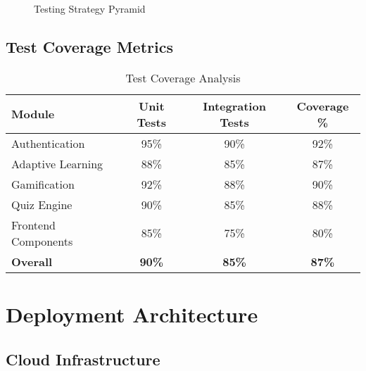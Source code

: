 \documentclass[12pt,a4paper]{article}
\begin{document}
\begin{figure}[H]
\centering
{}
\caption{Testing Strategy Pyramid}
\label{fig:testing-pyramid}
\end{figure}

\subsection{Test Coverage Metrics}

\begin{table}[H]
\centering
\caption{Test Coverage Analysis}
\begin{tabular}{|l|c|c|c|}
\hline
\textbf{Module} & \textbf{Unit Tests} & \textbf{Integration Tests} & \textbf{Coverage \%} \\
\hline
Authentication & 95\% & 90\% & 92\% \\
\hline
Adaptive Learning & 88\% & 85\% & 87\% \\
\hline
Gamification & 92\% & 88\% & 90\% \\
\hline
Quiz Engine & 90\% & 85\% & 88\% \\
\hline
Frontend Components & 85\% & 75\% & 80\% \\
\hline
\textbf{Overall} & \textbf{90\%} & \textbf{85\%} & \textbf{87\%} \\
\hline
\end{tabular}
\label{tab:test-coverage}
\end{table}

\section{Deployment Architecture}

\subsection{Cloud Infrastructure}
\end{document}
